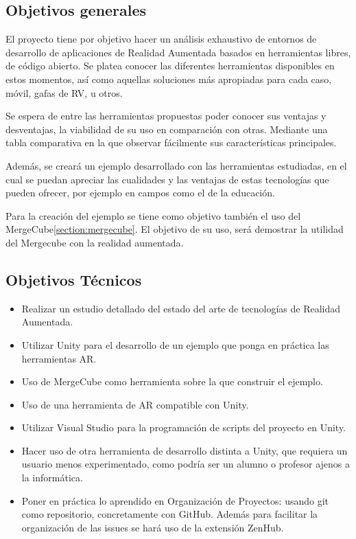 
\subsection{Objetivos generales}
El proyecto tiene por objetivo hacer un análisis exhaustivo de entornos de desarrollo de aplicaciones de Realidad Aumentada basados en herramientas libres, de código abierto. Se platea conocer las diferentes herramientas disponibles en estos momentos, así como aquellas soluciones más apropiadas para cada caso, móvil, gafas de RV, u otros.

Se espera de entre las herramientas propuestas poder conocer sus ventajas y desventajas, la viabilidad de su uso en comparación con otras. Mediante una tabla comparativa en la que observar fácilmente sus características principales.

Además, se creará un ejemplo desarrollado con las herramientas estudiadas, en el cual se puedan apreciar las cualidades y las ventajas de estas tecnologías que pueden ofrecer, por ejemplo en campos como el de la educación.

Para la creación del ejemplo se tiene como objetivo también el uso del MergeCube\ref{section:mergecube}. El objetivo de su uso, será demostrar la utilidad del Mergecube con la realidad aumentada.

 

\subsection{Objetivos Técnicos}
\begin{itemize}
\item Realizar un estudio detallado del estado del arte de tecnologías de Realidad Aumentada. 	
\item Utilizar Unity para el desarrollo de un ejemplo que ponga en práctica las herramientas AR.
\item Uso de MergeCube como herramienta sobre la que construir el ejemplo.
\item Uso de una herramienta de AR compatible con Unity.
\item Utilizar Visual Studio para la programación de scripts del proyecto en Unity.
\item Hacer uso de otra herramienta de desarrollo distinta a Unity, que requiera un usuario menos experimentado, como podría ser un alumno o profesor ajenos a la informática.
\item Poner en práctica lo aprendido en Organización de Proyectos: usando git como repositorio, concretamente con GitHub. Además para facilitar la organización de las issues  se hará uso de la extensión ZenHub.

	
\end{itemize}

